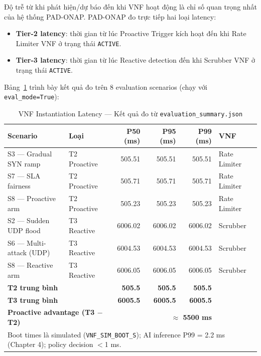 \documentclass[12pt,a4paper]{article}
\begin{document}
Độ trễ từ khi phát hiện/dự báo đến khi VNF hoạt động là chỉ số quan trọng nhất của hệ thống PAD-ONAP. PAD-ONAP đo trực tiếp hai loại latency:

\begin{itemize}
\item \textbf{Tier-2 latency}: thời gian từ lúc Proactive Trigger kích hoạt đến khi Rate Limiter VNF ở trạng thái \texttt{ACTIVE}.
\item \textbf{Tier-3 latency}: thời gian từ lúc Reactive detection đến khi Scrubber VNF ở trạng thái \texttt{ACTIVE}.
\end{itemize}

Bảng~\ref{tab:latency_results} trình bày kết quả đo trên 8 evaluation scenarios (chạy với \texttt{eval\_mode=True}):

\begin{table}[H]
\centering
\caption{VNF Instantiation Latency --- Kết quả đo từ \texttt{evaluation\_summary.json}}
\label{tab:latency_results}
\begin{tabular}{llrrrl}
\toprule
\textbf{Scenario} & \textbf{Loại} & \textbf{P50 (ms)} & \textbf{P95 (ms)} & \textbf{P99 (ms)} & \textbf{VNF} \\
\midrule
S3 — Gradual SYN ramp    & T2 Proactive & 505.51 & 505.51 & 505.51 & Rate Limiter \\
S7 — SLA fairness        & T2 Proactive & 505.71 & 505.71 & 505.71 & Rate Limiter \\
S8 — Proactive arm       & T2 Proactive & 505.23 & 505.23 & 505.23 & Rate Limiter \\
\midrule
S2 — Sudden UDP flood    & T3 Reactive  & 6006.02 & 6006.02 & 6006.02 & Scrubber \\
S6 — Multi-attack (UDP)  & T3 Reactive  & 6004.53 & 6004.53 & 6004.53 & Scrubber \\
S8 — Reactive arm        & T3 Reactive  & 6006.05 & 6006.05 & 6006.05 & Scrubber \\
\midrule
\multicolumn{2}{l}{\textbf{T2 trung bình}} & \textbf{505.5} & \textbf{505.5} & \textbf{505.5} & \\
\multicolumn{2}{l}{\textbf{T3 trung bình}} & \textbf{6005.5} & \textbf{6005.5} & \textbf{6005.5} & \\
\multicolumn{2}{l}{\textbf{Proactive advantage (T3 $-$ T2)}} & \multicolumn{3}{r}{\textbf{$\approx$ 5500 ms}} & \\
\bottomrule
\multicolumn{6}{l}{\footnotesize Boot times là simulated (\texttt{VNF\_SIM\_BOOT\_S}); AI inference P99 = 2.2 ms (Chapter 4); policy decision $<$1 ms.}
\end{tabular}
\end{table}
\end{document}
